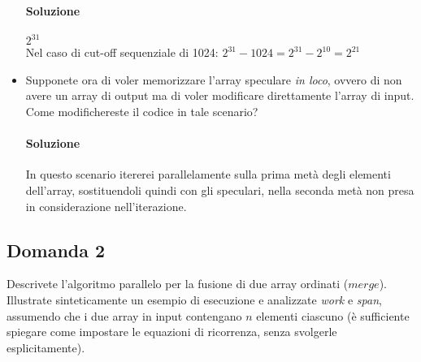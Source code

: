 \begin{itemize}
	\paragraph{Soluzione}
	$2^{31}$ \\
	Nel caso di cut-off sequenziale di 1024: $2^{31} - 1024 = 2^{31} - 2^{10} = 2^{21}$
	\item Supponete ora di voler memorizzare l'array speculare \textit{in loco}, ovvero di non avere un array di output ma di voler modificare direttamente l'array di input. Come modifichereste il codice in tale scenario?
	\paragraph{Soluzione}
	In questo scenario itererei parallelamente sulla prima met\`a degli elementi dell'array, sostituendoli quindi con gli speculari, nella seconda met\`a non presa in considerazione nell'iterazione.
\end{itemize}

\newpage

\subsection{Domanda 2}
Descrivete l'algoritmo parallelo per la fusione di due array ordinati ($merge$). Illustrate sinteticamente un esempio di esecuzione e analizzate \textit{work} e \textit{span}, assumendo che i due array in input contengano $n$ elementi ciascuno (è sufficiente spiegare come impostare le equazioni di ricorrenza, senza svolgerle esplicitamente).
